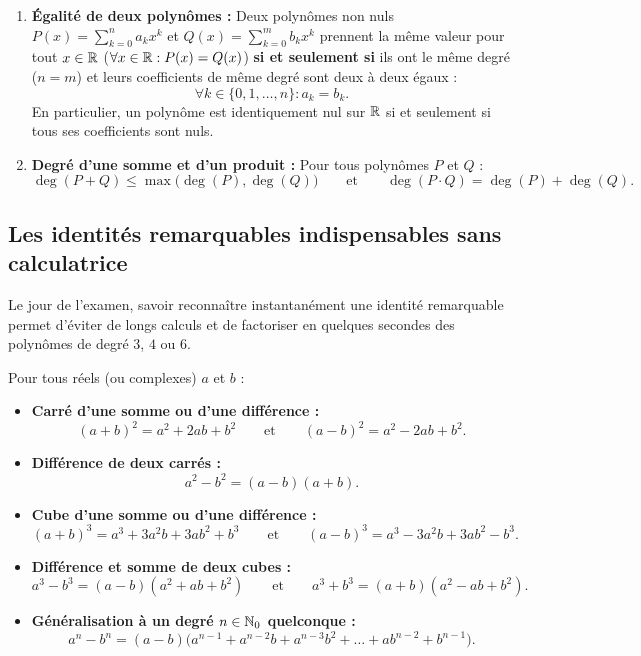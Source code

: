 \begin{theoreme}
\begin{enumerate}
    \item \textbf{Égalité de deux polynômes :} Deux polynômes non nuls $P(x) = \sum_{k=0}^n a_k x^k$ et $Q(x) = \sum_{k=0}^m b_k x^k$ prennent la même valeur pour tout $x \in \mathbb{R}$ ($\forall x \in \mathbb{R} : P(x) = Q(x)$) \textbf{si et seulement si} ils ont le même degré ($n = m$) et leurs coefficients de même degré sont deux à deux égaux :
    \[
        \boxed{\forall k \in \{0, 1, \dots, n\} : a_k = b_k}.
    \]
    En particulier, un polynôme est identiquement nul sur $\mathbb{R}$ si et seulement si tous ses coefficients sont nuls.
    \item \textbf{Degré d'une somme et d'un produit :} Pour tous polynômes $P$ et $Q$ :
    \[
        \deg(P + Q) \le \max\bigl(\deg(P), \deg(Q)\bigr) \qquad \text{et} \qquad \boxed{\deg(P \cdot Q) = \deg(P) + \deg(Q)}.
    \]
\end{enumerate}
\end{theoreme}

\subsection{Les identités remarquables indispensables sans calculatrice}

Le jour de l'examen, savoir reconnaître instantanément une identité remarquable permet d'éviter de longs calculs et de factoriser en quelques secondes des polynômes de degré $3$, $4$ ou $6$.

\begin{theoreme}
Pour tous réels (ou complexes) $a$ et $b$ :
\begin{itemize}
    \item \textbf{Carré d'une somme ou d'une différence :}
    \[
        (a + b)^2 = a^2 + 2ab + b^2 \qquad \text{et} \qquad (a - b)^2 = a^2 - 2ab + b^2.
    \]
    \item \textbf{Différence de deux carrés :}
    \[
        \boxed{a^2 - b^2 = (a - b)(a + b)}.
    \]
    \item \textbf{Cube d'une somme ou d'une différence :}
    \[
        (a + b)^3 = a^3 + 3a^2b + 3ab^2 + b^3 \qquad \text{et} \qquad (a - b)^3 = a^3 - 3a^2b + 3ab^2 - b^3.
    \]
    \item \textbf{Différence et somme de deux cubes :}
    \[
        \boxed{a^3 - b^3 = (a - b)(a^2 + ab + b^2)} \qquad \text{et} \qquad \boxed{a^3 + b^3 = (a + b)(a^2 - ab + b^2)}.
    \]
    \item \textbf{Généralisation à un degré $n \in \mathbb{N}_0$ quelconque :}
    \[
        a^n - b^n = (a - b)\bigl(a^{n-1} + a^{n-2}b + a^{n-3}b^2 + \dots + ab^{n-2} + b^{n-1}\bigr).
    \]
\end{itemize}
\end{theoreme}

